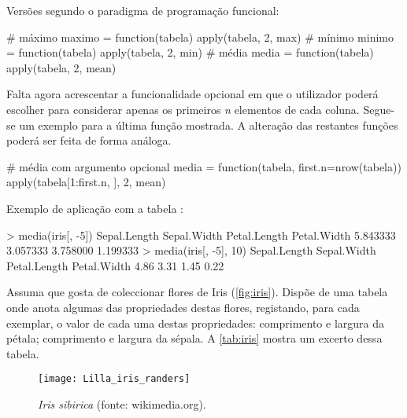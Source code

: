 \documentclass{exam}
\begin{document}
\begin{questions}
\begin{solution}
		Versões segundo o paradigma de programação funcional:
		\begin{rcode}
			# máximo
			maximo = function(tabela) {
				apply(tabela, 2, max)
			}
			# mínimo
			minimo = function(tabela) {
				apply(tabela, 2, min)
			}
			# média
			media = function(tabela) {
				apply(tabela, 2, mean)
			}
		\end{rcode}
		
		Falta agora acrescentar a funcionalidade opcional em que o utilizador poderá escolher para considerar apenas os primeiros \textit{n} elementos de cada coluna. Segue-se um exemplo para a última função mostrada. A alteração das restantes funções poderá ser feita de forma análoga.
		
		\begin{rcode}
			# média com argumento opcional
			media = function(tabela, first.n=nrow(tabela)) {
				apply(tabela[1:first.n, ], 2, mean)
			}
		\end{rcode}
		
		Exemplo de aplicação com a tabela :
		\begin{rcode}
			> media(iris[, -5])
			Sepal.Length  Sepal.Width Petal.Length  Petal.Width 
			5.843333     3.057333     3.758000     1.199333 
			> media(iris[, -5], 10)
			Sepal.Length  Sepal.Width Petal.Length  Petal.Width 
			4.86         3.31         1.45         0.22 
		\end{rcode}
	\end{solution}
	
	\question Assuma que gosta de coleccionar flores de Iris (\autoref{fig:iris}). Dispõe de uma tabela onde anota algumas das propriedades destas flores, registando, para cada exemplar, o valor de cada uma destas propriedades: comprimento e largura da pétala; comprimento e largura da sépala. A \autoref{tab:iris} mostra um excerto dessa tabela.
	
	\begin{figure}[t]
	   	\vspace{-40pt}
		\centering
		\texttt{[image: Lilla\_iris\_randers]}
		 \vspace{-10pt}
		\caption{\textit{Iris sibirica} (fonte: wikimedia.org).}
		\label{fig:iris}
	\end{figure}
	


\end{questions}
\end{document}
